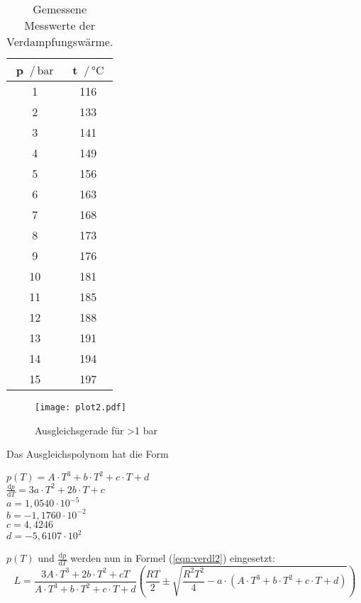 \begin{table}[H]
  \centering
  \caption{Gemessene Messwerte der Verdampfungswärme.}
  \label{tab:werte1}
  \begin{tabular}{c c}
    \toprule
    p $\,/\,\si{\bar}$ & t $\,/\, \si{\celsius}$ \\
    \midrule
    1 & 116 \\
    2 & 133 \\
    3 & 141 \\
    4 & 149 \\
    5 & 156 \\
    6 & 163 \\
    7 & 168 \\
    8 & 173 \\
    9 & 176 \\
    10 & 181 \\
    11 & 185 \\
    12 & 188 \\
    13 & 191 \\
    14 & 194 \\
    15 & 197 \\
    \bottomrule
  \end{tabular}
\end{table}

\begin{figure}
  \centering
  \texttt{[image: plot2.pdf]}
  \caption{Ausgleichsgerade für >1 bar}
  \label{fig:plot2}
\end{figure}
\newpage
Das Ausgleichspolynom hat die Form
\begin{center}
  $p(T)= A \cdot T^3 + b \cdot T^2 + c \cdot T + d$ \\
  $\frac{\mathrm{d}p}{\mathrm{d}T} = 3a \cdot T^2 + 2b \cdot T + c$ \\
  $a = 1,0540 \cdot 10^{-5}$  \\
  $b = -1,1760 \cdot 10^{-2}$ \\
  $c = 4,4246$ \\
  $d = -5,6107 \cdot 10^2$ \\
\end{center}
$p(T)$ und $\frac{\mathrm{d}p}{\mathrm{d}T}$ werden nun in Formel (\ref{eqn:verdl2}) eingesetzt:
\begin{equation*}
  L = \frac{3A \cdot T^3 + 2b \cdot T^2 + cT}{A \cdot T^3 + b \cdot T^2 + c \cdot T + d} \left(\frac{RT}{2} \pm \sqrt{\frac{R^2T^2}{4}-a\cdot(A \cdot T^3 + b \cdot T^2 + c \cdot T + d)}\right)
\end{equation*}